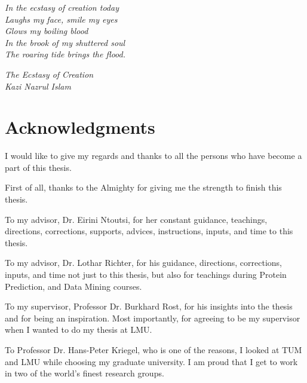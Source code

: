 \thispagestyle{empty}


\vspace*{2mm}

\epigraph{\textit{In the ecstasy of creation today\\
        Laughs my face, smile my eyes \\
        Glows my boiling blood \\
        In the brook of my shuttered soul \\
        The roaring tide brings the flood.} }{\textit{The Ecstasy of Creation \\ Kazi Nazrul Islam}}



\vspace*{10mm}

\section* {Acknowledgments}
\vspace{7mm}
I would like to give my regards and thanks to all the persons who have become a part of this thesis.

\vspace{4mm} First of all, thanks to the Almighty for giving me the strength to finish this thesis.

\vspace{2mm} To my advisor, Dr. Eirini Ntoutsi, for her constant guidance, teachings, directions, corrections, supports, advices, instructions, inputs, and time to this thesis.

\vspace{2mm} To my advisor, Dr. Lothar Richter, for his guidance, directions, corrections, inputs, and time not just to this thesis, but also for teachings during Protein Prediction, and Data Mining courses.

\vspace{2mm} To my supervisor, Professor Dr. Burkhard Rost, for his insights into the thesis and for being an inspiration. Most importantly, for agreeing to be my supervisor when I wanted to do my thesis at LMU.

\vspace{2mm} To Professor Dr. Hans-Peter Kriegel, who is one of the reasons, I looked at TUM and LMU while choosing my graduate university. I am proud that I get to work in two of the world's finest research groups.

